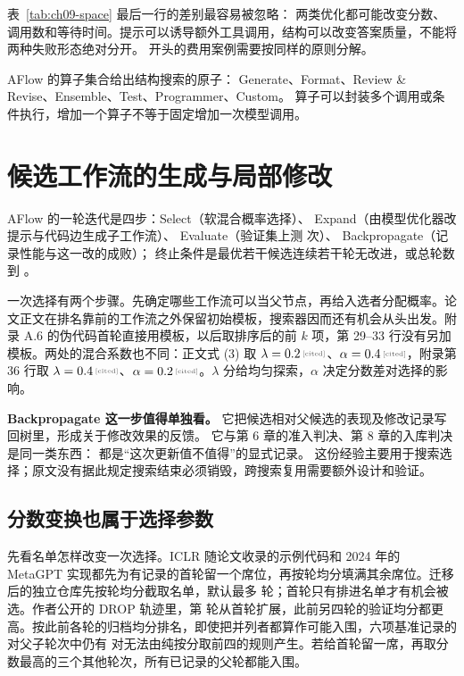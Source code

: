 表~\ref{tab:ch09-space} 最后一行的差别最容易被忽略：
两类优化都可能改变分数、调用数和等待时间。提示可以诱导额外工具调用，结构可以改变答案质量，不能将两种失败形态绝对分开。
开头的费用案例需要按同样的原则分解。

AFlow 的算子集合给出结构搜索的原子：
Generate、Format、Review \& Revise、Ensemble、Test、Programmer、Custom\cite{aflow-2410}。
算子可以封装多个调用或条件执行，增加一个算子不等于固定增加一次模型调用。

\section{候选工作流的生成与局部修改}
\label{sec:ch09-search}

AFlow 的一轮迭代是四步：Select（软混合概率选择）、
Expand（由模型优化器改提示与代码边生成子工作流）、
Evaluate（验证集上测  次）、
Backpropagate（记录性能与这一改的成败）；
终止条件是最优若干候选连续若干轮无改进，或总轮数到 \cite{aflow-2410}。

\begin{sloppypar}
一次选择有两个步骤。先确定哪些工作流可以当父节点，再给入选者分配概率。论文正文在排名靠前的工作流之外保留初始模板，搜索器因而还有机会从头出发。附录 A.6 的伪代码首轮直接用模板，以后取排序后的前 $k$ 项，第 29--33 行没有另加模板。两处的混合系数也不同：正文式 (3) 取 $\lambda=\cited{0.2}$、$\alpha=\cited{0.4}$，附录第 36 行取 $\lambda=\cited{0.4}$、$\alpha=\cited{0.2}$\cite{aflow-2410}。$\lambda$ 分给均匀探索，$\alpha$ 决定分数差对选择的影响。

\textbf{Backpropagate 这一步值得单独看。}
它把候选相对父候选的表现及修改记录写回树里，形成关于修改效果的反馈。
它与第 6 章的准入判决、第 8 章的入库判决是同一类东西：
都是``这次更新值不值得''的显式记录。
这份经验主要用于搜索选择；原文没有据此规定搜索结束必须销毁，跨搜索复用需要额外设计和验证。
\end{sloppypar}

\subsection{分数变换也属于选择参数}
\label{sec:ch09-score-scale}

先看名单怎样改变一次选择。ICLR 随论文收录的示例代码和 2024 年的 MetaGPT 实现都先为有记录的首轮留一个席位，再按轮均分填满其余席位\cite{aflow-2410,aflow-metagpt-2024}。迁移后的独立仓库先按轮均分截取名单，默认最多  轮；首轮只有排进名单才有机会被选\cite{aflow-code-2025}。作者公开的 DROP 轨迹里，第  轮从首轮扩展，此前另四轮的验证均分都更高\cite{aflow-code-2025}。按此前各轮的归档均分排名，即使把并列者都算作可能入围，六项基准记录的  对父子轮次中仍有  对无法由纯按分取前四的规则产生。若给首轮留一席，再取分数最高的三个其他轮次，所有已记录的父轮都能入围\cite{aflow-code-2025}。

